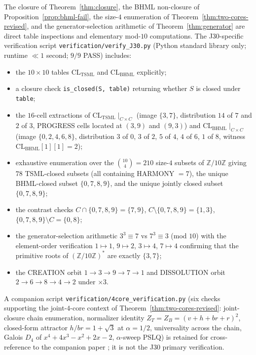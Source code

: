 \documentclass[11pt,reqno]{amsart}
\theoremstyle{plain}
\theoremstyle{definition}
\theoremstyle{remark}
\newcommand{\Z}{\mathbb{Z}}
\newcommand{\TSML}{\mathrm{TSML}}
\newcommand{\BHML}{\mathrm{BHML}}
\begin{document}
The closure of Theorem~\ref{thm:closure}, the BHML non-closure of
Proposition~\ref{prop:bhml-fail}, the size-$4$ enumeration of
Theorem~\ref{thm:two-cores-revised}, and the generator-selection
arithmetic of Theorem~\ref{thm:generator} are direct table
inspections and elementary mod-$10$ computations. The J30-specific
verification script \texttt{verification/verify\_J30.py} (Python
standard library only; runtime $\ll 1$ second; $9/9$ PASS) includes:
\begin{itemize}
\item the $10 \times 10$ tables $\mathrm{CL}_\TSML$ and
$\mathrm{CL}_\BHML$ explicitly;
\item a closure check
\texttt{is\_closed(S, table)} returning whether $S$ is closed under
\texttt{table};
\item the $16$-cell extractions of
$\mathrm{CL}_\TSML \mid_{C \times C}$ (image $\{3, 7\}$, distribution
$14$ of $7$ and $2$ of $3$, PROGRESS cells located at $(3, 9)$ and
$(9, 3)$) and $\mathrm{CL}_\BHML \mid_{C \times C}$ (image
$\{0, 2, 4, 6, 8\}$, distribution $3$ of $0$, $3$ of $2$, $5$ of $4$,
$4$ of $6$, $1$ of $8$, witness $\mathrm{CL}_\BHML[1][1] = 2$);
\item exhaustive enumeration over the $\binom{10}{4} = 210$ size-$4$
subsets of $\Z/10\Z$ giving $78$ TSML-closed subsets (all containing
HARMONY $= 7$), the unique BHML-closed subset $\{0, 7, 8, 9\}$, and
the unique jointly closed subset $\{0, 7, 8, 9\}$;
\item the contrast checks $C \cap \{0, 7, 8, 9\} = \{7, 9\}$,
$C \setminus \{0, 7, 8, 9\} = \{1, 3\}$, $\{0, 7, 8, 9\} \setminus C
= \{0, 8\}$;
\item the generator-selection arithmetic $3^{3} \equiv 7$ vs
$7^{3} \equiv 3$ (mod $10$) with the element-order verification
$1 \mapsto 1$, $9 \mapsto 2$, $3 \mapsto 4$, $7 \mapsto 4$ confirming
that the primitive roots of $(\Z/10\Z)^{*}$ are exactly $\{3, 7\}$;
\item the CREATION orbit $1 \to 3 \to 9 \to 7 \to 1$ and DISSOLUTION
orbit $2 \to 6 \to 8 \to 4 \to 2$ under $\times 3$.
\end{itemize}
A companion script \texttt{verification/4core\_verification.py} (six
checks supporting the joint-$4$-core context of
Theorem~\ref{thm:two-cores-revised}: joint-closure chain enumeration,
normalizer identity $Z_{T} = Z_{B} = (v + h + br + r)^{2}$, closed-form
attractor $h/br = 1 + \sqrt{3}$ at $\alpha = 1/2$, universality
across the chain, Galois $D_{4}$ of $x^{4} + 4x^{3} - x^{2} + 2x - 2$,
$\alpha$-sweep PSLQ) is retained for cross-reference to the
companion paper \cite{SandersGishFourCore}; it is not the J30
primary verification.
\end{document}
